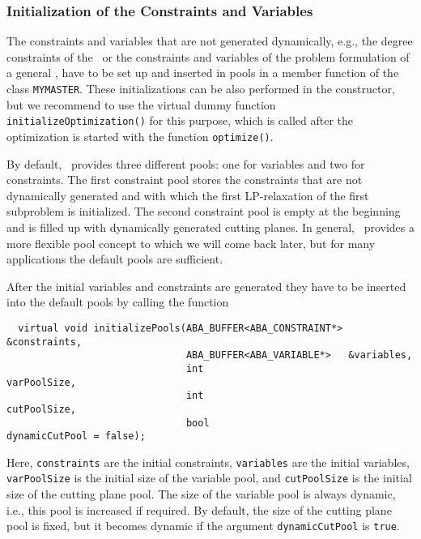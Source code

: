 \subsubsection{Initialization of the Constraints and Variables}

The constraints and variables that are not generated dynamically, e.g., the
degree constraints of the \tsp\ or the constraints and variables of the
problem formulation of a general \mip, have to
be set up and inserted in pools in a member function of 
the class {\tt MYMASTER}. These initializations
can be also performed in the constructor, but we recommend to use
the virtual dummy function 
{\tt initializeOptimization()}
for this purpose,
which is called after the optimization
is started with the function {\tt optimize()}.

By default, \ABACUS\ provides three different pools: 
one for variables
and two for constraints. The first constraint pool stores the constraints
that are not dynamically generated and with which the first LP-relaxation
of the first subproblem is initialized. The second constraint pool is
empty at the beginning and is filled up with dynamically generated cutting
planes. In general, \ABACUS\ provides a more flexible pool concept to
which we will come back later, but for many applications the default 
pools are sufficient.

After the initial variables and constraints are generated they have to be 
inserted into the default pools by calling the function
\begin{verbatim}
  virtual void initializePools(ABA_BUFFER<ABA_CONSTRAINT*> &constraints,
                               ABA_BUFFER<ABA_VARIABLE*>   &variables,
                               int                          varPoolSize,
                               int                          cutPoolSize,
                               bool                         dynamicCutPool = false);
\end{verbatim}
Here, {\tt constraints} are the initial constraints, {\tt variables} are
the initial variables, {\tt varPoolSize} is the initial size of the variable pool,
and {\tt cutPoolSize} is the initial size of the cutting plane pool. The 
size of the variable pool is always dynamic, i.e., this pool is increased
if required. By default, the size of the cutting plane pool is fixed,
but it becomes dynamic if the argument {\tt dynamicCutPool} is {\tt true}.

